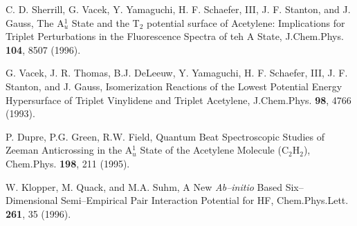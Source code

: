 \begin{thebibliography}{999}

%
%
%
%

C. D. Sherrill, G. Vacek, Y. Yamaguchi, H. F. Schaefer, III, 
J. F. Stanton, and J. Gauss,
The A$^1_u$ State and the T$_2$ potential surface
of Acetylene: Implications for Triplet Perturbations in the
Fluorescence Spectra of teh A State,
J.Chem.Phys. {\bf 104}, 8507 (1996).

G. Vacek, J. R. Thomas, B.J. DeLeeuw, Y. Yamaguchi, H. F. Schaefer, III, 
J. F. Stanton, and J. Gauss,
Isomerization Reactions of the Lowest Potential
Energy Hypersurface of Triplet Vinylidene and Triplet Acetylene,
J.Chem.Phys. {\bf 98}, 4766 (1993).

P. Dupre, P.G. Green, R.W. Field, 
Quantum Beat Spectroscopic Studies of Zeeman Anticrossing
in the A$^1_u$ State of the Acetylene Molecule
(C$_2$H$_2$),
Chem.Phys. {\bf 198}, 211 (1995). 

W. Klopper, M. Quack, and M.A. Suhm,
A New {\it Ab--initio} Based Six--Dimensional Semi--Empirical Pair
Interaction Potential for HF,
Chem.Phys.Lett. {\bf 261}, 35 (1996).



\end{thebibliography}




